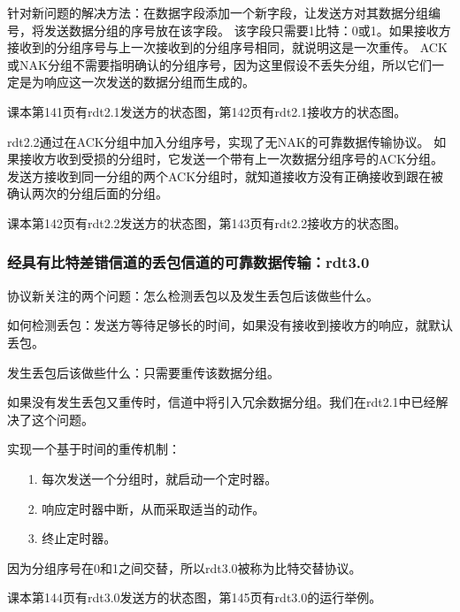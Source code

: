\documentclass[a4paper,left=2.5cm,right=2.5cm,11pt]{article}
\begin{document}
	针对新问题的解决方法：在数据字段添加一个新字段，让发送方对其数据分组编号，将发送数据分组的序号放在该字段。
	该字段只需要1比特：0或1。如果接收方接收到的分组序号与上一次接收到的分组序号相同，就说明这是一次重传。
	ACK或NAK分组不需要指明确认的分组序号，因为这里假设不丢失分组，所以它们一定是为响应这一次发送的数据分组而生成的。\par

	课本第141页有rdt2.1发送方的状态图，第142页有rdt2.1接收方的状态图。\par

	rdt2.2通过在ACK分组中加入分组序号，实现了无NAK的可靠数据传输协议。
	如果接收方收到受损的分组时，它发送一个带有上一次数据分组序号的ACK分组。
	发送方接收到同一分组的两个ACK分组时，就知道接收方没有正确接收到跟在被确认两次的分组后面的分组。\par

	课本第142页有rdt2.2发送方的状态图，第143页有rdt2.2接收方的状态图。\par

\subsubsection{经具有比特差错信道的丢包信道的可靠数据传输：rdt3.0}
	协议新关注的两个问题：怎么检测丢包以及发生丢包后该做些什么。\par

	如何检测丢包：发送方等待足够长的时间，如果没有接收到接收方的响应，就默认丢包。\par

	发生丢包后该做些什么：只需要重传该数据分组。\par

	如果没有发生丢包又重传时，信道中将引入冗余数据分组。我们在rdt2.1中已经解决了这个问题。\par

	实现一个基于时间的重传机制：
	\begin{itemize}
		\item[1.] 每次发送一个分组时，就启动一个定时器。
		\item[2.] 响应定时器中断，从而采取适当的动作。
		\item[3.] 终止定时器。
	\end{itemize}

	因为分组序号在0和1之间交替，所以rdt3.0被称为比特交替协议。\par

	课本第144页有rdt3.0发送方的状态图，第145页有rdt3.0的运行举例。\par
\end{document}
